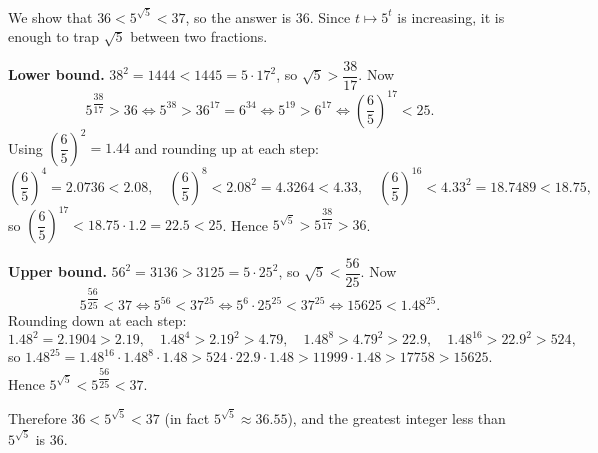 We show that $36<5^{\sqrt5}<37$, so the answer is $\boxed{36}$. Since $t\mapsto5^t$ is increasing, it is enough to trap $\sqrt5$ between two fractions.

\textbf{Lower bound.} $38^2=1444<1445=5\cdot17^2$, so $\sqrt5>\dfrac{38}{17}$. Now
\[
5^{\dfrac{38}{17}}>36\iff5^{38}>36^{17}=6^{34}\iff5^{19}>6^{17}\iff\left(\dfrac{6}{5}\right)^{17}<25 .
\]
Using $\left(\dfrac{6}{5}\right)^2=1.44$ and rounding up at each step:
\[
\left(\dfrac{6}{5}\right)^4=2.0736<2.08,\quad\left(\dfrac{6}{5}\right)^8<2.08^2=4.3264<4.33,\quad\left(\dfrac{6}{5}\right)^{16}<4.33^2=18.7489<18.75,
\]
so $\left(\dfrac{6}{5}\right)^{17}<18.75\cdot1.2=22.5<25$. Hence $5^{\sqrt5}>5^{\dfrac{38}{17}}>36$.

\textbf{Upper bound.} $56^2=3136>3125=5\cdot25^2$, so $\sqrt5<\dfrac{56}{25}$. Now
\[
5^{\dfrac{56}{25}}<37\iff5^{56}<37^{25}\iff5^{6}\cdot25^{25}<37^{25}\iff15625<1.48^{25}.
\]
Rounding down at each step:
\[
1.48^2=2.1904>2.19,\quad1.48^4>2.19^2>4.79,\quad1.48^8>4.79^2>22.9,\quad1.48^{16}>22.9^2>524,
\]
so $1.48^{25}=1.48^{16}\cdot1.48^{8}\cdot1.48>524\cdot22.9\cdot1.48>11999\cdot1.48>17758>15625$. Hence $5^{\sqrt5}<5^{\dfrac{56}{25}}<37$.

Therefore $36<5^{\sqrt5}<37$ (in fact $5^{\sqrt5}\approx36.55$), and the greatest integer less than $5^{\sqrt5}$ is $36$.
